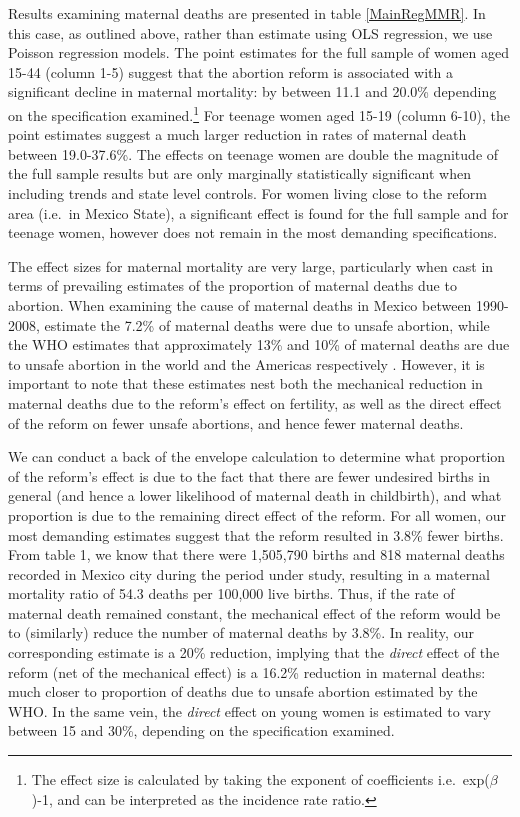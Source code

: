 \documentclass[a4paper, 11pt]{article}
\begin{document}
\begin{spacing}{2}
Results examining maternal deaths are presented in table \ref{MainRegMMR}. In this case, as outlined above, rather than estimate using OLS regression, we use Poisson regression models. The point estimates for the full sample of women aged 15-44 (column 1-5) suggest that the abortion reform is associated with a significant decline in maternal mortality: by between 11.1 and 20.0\% depending on the specification examined.\footnote{The effect size is calculated by taking the exponent of coefficients i.e.\ exp($\beta$)-1, and can be interpreted as the incidence rate ratio.} For teenage women aged 15-19 (column 6-10), the point estimates suggest a much larger reduction in rates of maternal death between 19.0-37.6\%. The effects on teenage women are double the magnitude of the full sample results but are only marginally statistically significant when including trends and state level controls. For women living close to the reform area (i.e.\ in Mexico State), a significant effect is found for the full sample and for teenage women, however does not remain in the most demanding specifications.

The effect sizes for maternal mortality are very large, particularly when cast in terms of prevailing estimates of the proportion of maternal deaths due to abortion.  When examining the cause of maternal deaths in Mexico between 1990-2008, \citet{Schiavonetal2012} estimate the 7.2\% of maternal deaths were due to unsafe abortion, while the WHO estimates that approximately 13\% and 10\% of maternal deaths are due to unsafe abortion in the world and the Americas respectively \citep{WHO2011}.  However, it is important to note that these estimates nest both the mechanical reduction in maternal deaths due to the reform's effect on fertility, as well as the direct effect of the reform on fewer unsafe abortions, and hence fewer maternal deaths.

We can conduct a back of the envelope calculation to determine what proportion of the reform's effect is due to the fact that there are fewer undesired births in general (and hence a lower likelihood of maternal death in childbirth), and what proportion is due to the remaining direct effect of the reform.  For all women, our most demanding estimates suggest that the reform resulted in 3.8\% fewer births.  From table 1, we know that there were 1,505,790 births and 818 maternal deaths recorded in Mexico city during the period under study, resulting in a maternal mortality ratio of 54.3 deaths per 100,000 live births.  Thus, if the rate of maternal death remained constant, the mechanical effect of the reform would be to (similarly) reduce the number of maternal deaths by 3.8\%.  In reality, our corresponding estimate is a 20\% reduction, implying that the \emph{direct} effect of the reform (net of the mechanical effect) is a 16.2\% reduction in maternal deaths: much closer to proportion of deaths due to unsafe abortion estimated by the WHO.  In the same vein, the \emph{direct} effect on young women is estimated to vary between 15 and 30\%, depending on the specification examined.


\end{spacing}
\end{document}
